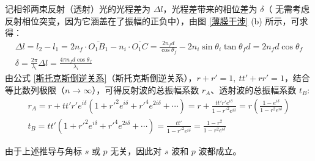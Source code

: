 \documentclass[UTF8]{report}
\theoremstyle{MyLineTheoremStyle} %
\theoremstyle{MyBlockTheoremStyle} %
\theoremstyle{MySubsubsectionStyle} %
\begin{document}
记相邻两束反射（透射）光的光程差为 $\Delta l$，光程差带来的相位差为 $\delta$（{\color{red} 无需考虑反射相位突变，因为它涵盖在了振幅的正负中}），由图 \ref{薄膜干涉} (b) 所示，可求得：
\begin{gather}
    \Delta l = l_2 - l_1 = 2 n_f\cdot  \overline{O_1B_1} - n_i\cdot  \overline{O_1 C} = \frac{2 n_f d}{\cos \theta_f} - 2 n_i \sin \theta_i \tan \theta_f d = 2 n_f d \cos \theta_f \\ 
    \delta = \frac{2 \pi}{\lambda_i} \Delta l = \frac{4 \pi n_f d \cos \theta_f}{\lambda_i}
\end{gather}
由公式 \ref{斯托克斯倒逆关系}（斯托克斯倒逆关系），$r + r' = 1,\ tt' + rr' =1$，结合等比数列极限（$n \to \infty$），可得反射波的总振幅系数 $r_A$、透射波的总振幅系数 $t_B$:
\begin{gather}
    r_A 
    = r + tt'r' e^{i \delta}\left( 1 + r'^2e^{i \delta} +  r'^4e^{2 i \delta} + \cdots\right) 
    = r +  \frac{tt'r'e^{i \delta}}{1 - r'^2e^{i \delta}} 
    = r \left( \frac{1 - e^{i \delta}}{1 - r^2 e^{i \delta}} \right)
    \\ 
    t_B 
    =  tt' \left( 1 + r'^2e^{i \delta} +  r'^4e^{2 i \delta} + \cdots \right) = \frac{tt'}{1 - r'^2e^{i \delta}} = \frac{1 - r^2}{1 - r^2 e^{i \delta}}
\end{gather}

由于上述推导与角标 $s$ 或 $p$ 无关，因此对 $s$ 波和 $p$ 波都成立。
\end{document}
